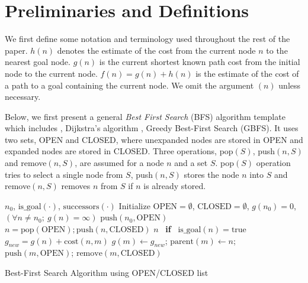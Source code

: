 \section{Preliminaries and Definitions}

\label{sec:preliminaries}

We first define some notation and terminology used throughout the
rest of the paper.
$h(n)$ denotes the estimate of the cost from the current node $n$ to the nearest goal node.
$g(n)$ is the current shortest known path cost from the initial node to the current node.
$f(n)=g(n)+h(n)$ is the estimate of the cost of a path to a goal
containing the current node.
We omit the argument $(n)$ unless necessary.

Below, we first present a general \emph{Best First Search} (BFS) algorithm template which includes  \astar, Dijkstra's algorithm \citeyear{dijkstra1959note}, Greedy Best-First Search (GBFS).
It uses two sets, OPEN and CLOSED, where unexpanded nodes are stored in OPEN and expanded nodes are stored in CLOSED. Three operations, pop$(S)$, push$(n,S)$ and remove$(n,S)$, are assumed for a node $n$ and a set $S$.
pop$(S)$ operation tries to select a single node from $S$,
push$(n,S)$ stores the node $n$ into $S$ and remove$(n,S)$ removes $n$ from $S$ if $n$ is already stored.

\begin{algorithm}                      
\begin{algorithmic}[1]
 \REQUIRE $n_0$, $\text{is\_goal}(\cdot)$, $\text{successors}(\cdot)$ %
 \STATE Initialize $\text{OPEN}=\emptyset$, $\text{CLOSED}=\emptyset$, $g(n_0)=0$, $\left(\forall n\not=n_0;\ g(n)=\infty\right)$
 \STATE $\text{push}(n_0,\text{OPEN})$
 \STATE $n = \text{pop}(\text{OPEN}); \text{push}(n,\text{CLOSED})$
 \RETURN $n$ \  \textbf{if} \  $\text{is\_goal}(n)=\text{true}$
 \STATE $g_{new} = g(n) + \text{cost}(n,m)$
 \STATE $g(m) \leftarrow g_{new}$;\; $\text{parent}(m) \leftarrow n$;\; $\text{push}(m,\text{OPEN})$;\; $\text{remove}(m,\text{CLOSED})$
 \ENDIF
 \ENDFOR
 \ENDWHILE
\end{algorithmic}
\caption{Best-First Search Algorithm using OPEN/CLOSED list}
\label{alg:ocl}
\end{algorithm}

